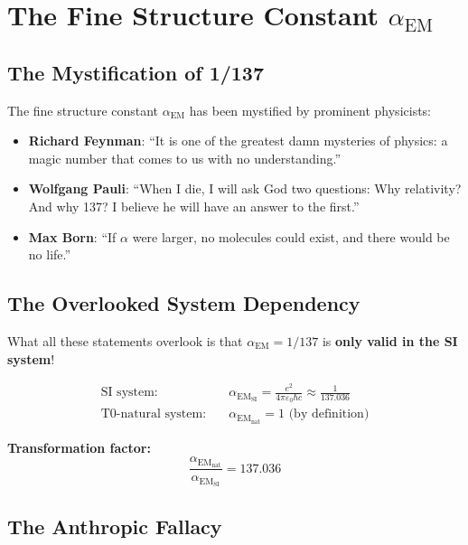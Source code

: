 \documentclass[12pt,a4paper]{article}
\newcommand{\alphaEM}{\alpha_{\text{EM}}}
\newcommand{\epsilonzero}{\varepsilon_0}
\newcommand{\pichar}{\pi}
\begin{document}
	\section{The Fine Structure Constant $\alphaEM$}
	\label{sec:alpha_em}
	
	\subsection{The Mystification of 1/137}
	\label{subsec:alpha_mystification}
	
	The fine structure constant $\alphaEM$ has been mystified by prominent physicists:
	
	\begin{itemize}
		\item \textbf{Richard Feynman}: ``It is one of the greatest damn mysteries of physics: a magic number that comes to us with no understanding.''
		\item \textbf{Wolfgang Pauli}: ``When I die, I will ask God two questions: Why relativity? And why 137? I believe he will have an answer to the first.''
		\item \textbf{Max Born}: ``If $\alpha$ were larger, no molecules could exist, and there would be no life.''
	\end{itemize}
	
	\subsection{The Overlooked System Dependency}
	\label{subsec:alpha_system_dependency}
	
	What all these statements overlook is that $\alphaEM = 1/137$ is \textbf{only valid in the SI system}!
	
	\begin{align}
		\text{SI system:} \quad &\alphaEM_{\text{SI}} = \frac{e^2}{4\pichar\epsilonzero\hbar c} \approx \frac{1}{137.036} \\
		\text{T0-natural system:} \quad &\alphaEM_{\text{nat}} = 1 \text{ (by definition)}
	\end{align}
	
	\textbf{Transformation factor:}
	$$\frac{\alphaEM_{\text{nat}}}{\alphaEM_{\text{SI}}} = 137.036$$
	
	\subsection{The Anthropic Fallacy}
	\label{subsec:anthropic_fallacy}
	
\end{document}
